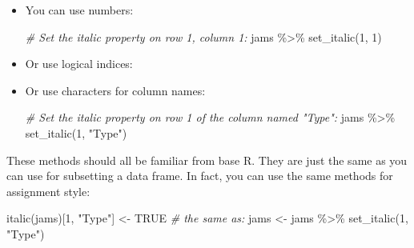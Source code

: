 \documentclass[
]{article}
\newenvironment{Shaded}{\begin{snugshade}}{\end{snugshade}}
\newcommand{\CommentTok}[1]{\textcolor[rgb]{0.56,0.35,0.01}{\textit{#1}}}
\newcommand{\ConstantTok}[1]{\textcolor[rgb]{0.00,0.00,0.00}{#1}}
\newcommand{\DecValTok}[1]{\textcolor[rgb]{0.00,0.00,0.81}{#1}}
\newcommand{\FunctionTok}[1]{\textcolor[rgb]{0.00,0.00,0.00}{#1}}
\newcommand{\NormalTok}[1]{#1}
\newcommand{\OtherTok}[1]{\textcolor[rgb]{0.56,0.35,0.01}{#1}}
\newcommand{\SpecialCharTok}[1]{\textcolor[rgb]{0.00,0.00,0.00}{#1}}
\newcommand{\StringTok}[1]{\textcolor[rgb]{0.31,0.60,0.02}{#1}}
\begin{document}
\begin{itemize}
\item
  You can use numbers:

\begin{Shaded}
\begin{Highlighting}[]
\CommentTok{\# Set the italic property on row 1, column 1:}
\NormalTok{jams }\SpecialCharTok{\%\textgreater{}\%} \FunctionTok{set\_italic}\NormalTok{(}\DecValTok{1}\NormalTok{, }\DecValTok{1}\NormalTok{) }
\end{Highlighting}
\end{Shaded}

  \FloatBarrier
\item
  Or use logical indices:

\begin{Shaded}
\end{Shaded}

  \FloatBarrier
\item
  Or use characters for column names:

\begin{Shaded}
\begin{Highlighting}[]
\CommentTok{\# Set the italic property on row 1 of the column named "Type":}
\NormalTok{jams }\SpecialCharTok{\%\textgreater{}\%} \FunctionTok{set\_italic}\NormalTok{(}\DecValTok{1}\NormalTok{, }\StringTok{"Type"}\NormalTok{)}
\end{Highlighting}
\end{Shaded}

  \FloatBarrier
\end{itemize}

These methods should all be familiar from base R. They are just the same
as you can use for subsetting a data frame. In fact, you can use the
same methods for assignment style:

\begin{Shaded}
\begin{Highlighting}[]
\FunctionTok{italic}\NormalTok{(jams)[}\DecValTok{1}\NormalTok{, }\StringTok{"Type"}\NormalTok{] }\OtherTok{\textless{}{-}} \ConstantTok{TRUE}
\CommentTok{\# the same as:}
\NormalTok{jams }\OtherTok{\textless{}{-}}\NormalTok{ jams }\SpecialCharTok{\%\textgreater{}\%} \FunctionTok{set\_italic}\NormalTok{(}\DecValTok{1}\NormalTok{, }\StringTok{"Type"}\NormalTok{)}
\end{Highlighting}
\end{Shaded}
\end{document}
